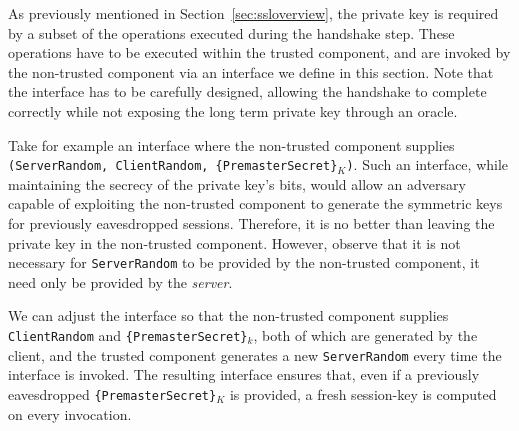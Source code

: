 \documentclass[../../main.tex]{subfiles}
\begin{document}
As previously mentioned in Section~\ref{sec:ssloverview}, the private
key is required by a subset of the operations executed during the
handshake step. These operations have to be executed within the
trusted component, and are invoked by the non-trusted component via an
interface we define in this section. Note that the interface has to be
carefully designed, allowing the handshake to complete correctly while
not exposing the long term private key through an oracle.

Take for example an interface where the non-trusted component supplies
\texttt{(ServerRandom, ClientRandom, \{PremasterSecret\}$_K$)}. Such
an interface, while maintaining the secrecy of the private key's bits,
would allow an adversary capable of exploiting the non-trusted
component to generate the symmetric keys for previously eavesdropped
sessions. Therefore, it is no better than leaving the private key in
the non-trusted component.  However, observe that it is not necessary
for \texttt{ServerRandom} to be provided by the non-trusted component,
it need only be provided by the \textit{server}.


We can adjust the interface so that the non-trusted component supplies
\texttt{ClientRandom} and \texttt{\{PremasterSecret\}$_k$}, both of
which are generated by the client, and the trusted component generates
a new \texttt{ServerRandom} every time the interface is invoked. The
resulting interface ensures that, even if a previously eavesdropped
\texttt{\{PremasterSecret\}$_K$} is provided, a fresh session-key is
computed on every invocation.
\end{document}
